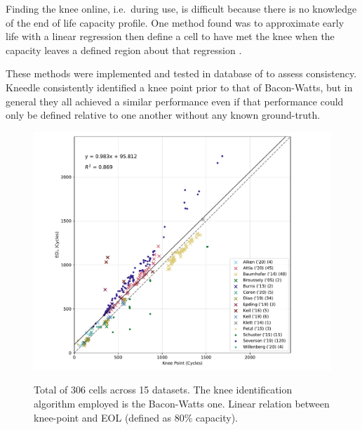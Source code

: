 \documentclass{article}
\begin{document}
Finding the knee online, i.e.\ during use, is difficult because there is no knowledge of the end of life capacity profile. One method found was to approximate early life with a linear regression then define a cell to have met the knee when the capacity leaves a defined region about that regression \cite{zhang_accelerated_2019}.

These methods were implemented and tested in database of \cite{severson_data-driven_2019} to assess consistency. Kneedle consistently identified a knee point prior to that of Bacon-Watts, but in general they all achieved a similar performance even if that performance could only be defined relative to one another without any known ground-truth.




\begin{figure}[ht]
\centering
\includegraphics[width=0.8\linewidth]{figures/AcrossDatasetsknee-to-EOL}
  \label{fig:kneepoint2EOL}
\caption{Total of 306 cells across 15 datasets. The knee identification algorithm employed is the Bacon-Watts one. Linear relation between knee-point and EOL (defined as 80\% capacity).}
\label{fig:knees2EOL}
\end{figure}
\end{document}
